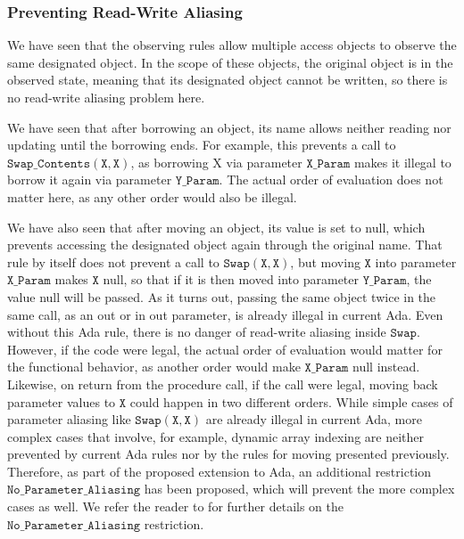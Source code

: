 \documentclass{llncs}
\newcommand\var[1]{\ensuremath{\mathtt{#1}}}
\newcommand{\keyword}[1]{\textsf{#1}}
\begin{document}


\subsubsection{Preventing Read-Write Aliasing}
\label{sec:noaliasing}

We have seen that the observing rules allow multiple access objects to observe the same designated object. In the scope of these objects, the original object is in the observed state, meaning that its designated object
cannot be written, so there is no read-write aliasing problem here.


We have seen that after borrowing an object, its name allows neither reading nor updating until the borrowing ends. For example, this prevents a call to \var{Swap\_Contents (X, X)},
as borrowing X via parameter \var{X\_Param} makes it illegal to borrow it again via parameter \var{Y\_Param}. The actual order of evaluation does not matter here, as any other order would also be illegal.


We have also seen that after moving an object, its value is set to null, which prevents accessing the designated object again through the original name.
That rule by itself does not prevent a call to \var{Swap(X, X)}, but moving \var{X} into parameter \var{X\_Param} makes \var{X} null, so that if it is then moved into parameter \var{Y\_Param}, the value null will be passed.   As it turns out, passing the same object twice in the same call, as an \keyword{out} or \keyword{in out} parameter, is already illegal in current Ada.
Even without this Ada rule, there is no danger of read-write aliasing inside \var{Swap}. However, if the code were legal, the actual order of evaluation would matter for the functional behavior, as another order would make \var{X\_Param} null
instead. Likewise, on return from the procedure call, if the call were legal, moving back parameter values to \var{X} could happen in two different orders.
While simple cases of parameter aliasing like \var{Swap(X,X)} are already illegal in current Ada, more complex cases that involve, for example, dynamic array indexing are neither
prevented by current Ada rules nor by the rules for moving presented previously. Therefore, as part of the proposed
extension to Ada, an additional restriction \var{No\_Parameter\_Aliasing} has been proposed,
which will prevent the more complex cases as well. We refer the reader to \cite{AI2018} for further details on the \var{No\_Parameter\_Aliasing} restriction.
\end{document}
